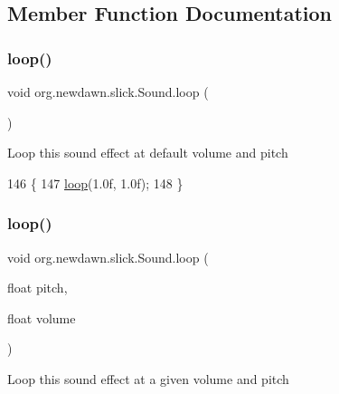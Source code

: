 \subsection{Member Function Documentation}
\mbox{\label{classorg_1_1newdawn_1_1slick_1_1_sound_a6642a989affb6089a72cd6ee5150a146}} 
\subsubsection{\texorpdfstring{loop()}{loop()}\hspace{0.1cm}{\footnotesize\ttfamily [1/2]}}
{\footnotesize\ttfamily void org.\+newdawn.\+slick.\+Sound.\+loop (\begin{DoxyParamCaption}{ }\end{DoxyParamCaption})\hspace{0.3cm}{\ttfamily [inline]}}

Loop this sound effect at default volume and pitch 
\begin{DoxyCode}
146                        \{
147         \mbox{\hyperlink{classorg_1_1newdawn_1_1slick_1_1_sound_a6642a989affb6089a72cd6ee5150a146}{loop}}(1.0f, 1.0f);
148     \}
\end{DoxyCode}
\mbox{\label{classorg_1_1newdawn_1_1slick_1_1_sound_a9babdfc6029478c514f5155b0fb53d42}} 
\subsubsection{\texorpdfstring{loop()}{loop()}\hspace{0.1cm}{\footnotesize\ttfamily [2/2]}}
{\footnotesize\ttfamily void org.\+newdawn.\+slick.\+Sound.\+loop (\begin{DoxyParamCaption}\item[{float}]{pitch,  }\item[{float}]{volume }\end{DoxyParamCaption})\hspace{0.3cm}{\ttfamily [inline]}}

Loop this sound effect at a given volume and pitch


